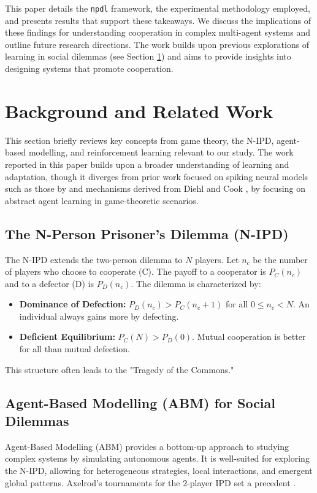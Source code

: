 \documentclass[]{llncs} %
\begin{document}
This paper details the \texttt{npdl} framework, the experimental methodology employed, and presents results that support these takeaways. We discuss the implications of these findings for understanding cooperation in complex multi-agent systems and outline future research directions. The work builds upon previous explorations of learning in social dilemmas (see Section \ref{sec:litreview}) and aims to provide insights into designing systems that promote cooperation.

\section{Background and Related Work}
\label{sec:litreview}

This section briefly reviews key concepts from game theory, the N-IPD, agent-based modelling, and reinforcement learning relevant to our study.
The work reported in this paper builds upon a broader understanding of learning and adaptation, though it diverges from prior work focused on spiking neural models such as those by \cite{Huyck, Huyck-Samey, HuyckErekpaine} and mechanisms derived from Diehl and Cook \cite{Diehl}, by focusing on abstract agent learning in game-theoretic scenarios.

\subsection{The N-Person Prisoner's Dilemma (N-IPD)}
The N-IPD extends the two-person dilemma to $N$ players. %
Let $n_c$ be the number of players who choose to cooperate (C). The payoff to a cooperator is $P_C(n_c)$ and to a defector (D) is $P_D(n_c)$. The dilemma is characterized by:
\begin{itemize}
    \item \textbf{Dominance of Defection:} $P_D(n_c) > P_C(n_c+1)$ for all $0 \le n_c < N$. An individual always gains more by defecting.
    \item \textbf{Deficient Equilibrium:} $P_C(N) > P_D(0)$. Mutual cooperation is better for all than mutual defection.
\end{itemize}
This structure often leads to the "Tragedy of the Commons." %

\subsection{Agent-Based Modelling (ABM) for Social Dilemmas}
Agent-Based Modelling (ABM) provides a bottom-up approach to studying complex systems by simulating autonomous agents. %
It is well-suited for exploring the N-IPD, allowing for heterogeneous strategies, local interactions, and emergent global patterns. Axelrod's tournaments for the 2-player IPD set a precedent \cite{Axelrod}. %
\end{document}
